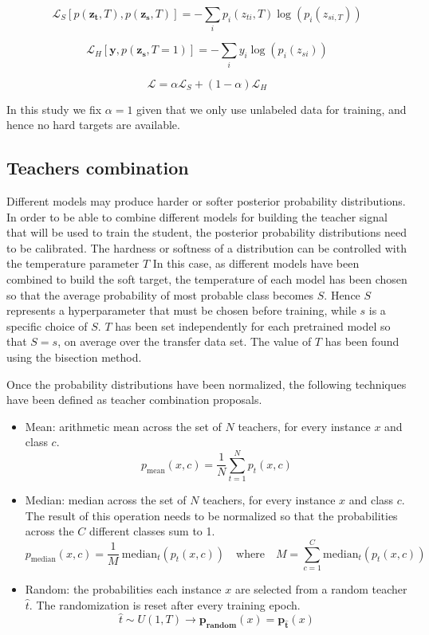 \documentclass{elsarticle}
\begin{document}
	\begin{equation}
	\mathcal{L}_S\left[p( \mathbf{z_t}, T), p(\mathbf{z_s}, T) \right] = -\sum_i p_i(z_{ti}, T) \log \left(p_i(z_{si, T})\right)
	\label{eq:ced}
	\end{equation}
	
	\begin{equation}
	\mathcal{L}_{H}\left[\mathbf{y}, p(\mathbf{z_s}, T=1) \right] = -\sum_i y_i \log \left(p_i(z_{si})\right)
	\label{eq:ces}
	\end{equation}
	
	\begin{equation}
	\mathcal{L} = \alpha \mathcal{L}_S + (1-\alpha) \mathcal{L}_{H}
	\label{eq:loss_distillation}
	\end{equation}
	
	In this study we fix $\alpha=1$ given that we only use unlabeled data for training, and hence no hard targets are available.
	
	\subsection{Teachers combination} \label{sec:teachers_comb}
	 Different models may produce harder or softer posterior probability distributions. In order to be able to combine  different models for building the teacher signal that will be used to train the student, the posterior probability distributions need to be calibrated. The hardness or softness of a distribution can be controlled with the temperature parameter $T$ In this case, as different models have been combined to build the soft target, the temperature of each model has been chosen so that the average probability of most probable class becomes $S$. Hence $S$ represents a hyperparameter that must be chosen before training, while $s$ is a specific choice of $S$.  $T$ has been set independently for each pretrained model so that $S=s$, on average over the transfer data set. The value of $T$ has been found using the bisection method.
	 
	 Once the probability distributions have been normalized, the following techniques have been defined as teacher combination proposals.
	 
	 \begin{itemize}
	 	\item Mean: arithmetic mean across the set of $N$ teachers, for every instance $x$ and class $c$. 
	 	$$p_{\text{mean}}(x, c) = \frac{1}{N} \sum_{t=1}^N p_{t}(x, c)$$
	 	\item Median: median across the set of $N$ teachers, for every instance $x$ and class $c$. The result of this operation needs to be normalized so that the probabilities across the $C$ different classes sum to 1. $$p_{\text{median}}(x, c) = \frac{1}{M} \ \text{median}_t( p_{t}(x, c)) \quad \text{where} \quad M = \sum_{c=1}^C  \text{median}_t( p_{t}(x, c))$$
	 	\item Random: the probabilities each instance $x$ are selected from a random teacher $\hat{t}$. The randomization is reset after every training epoch. 
	 	$$\hat{t} \sim U(1, T) \rightarrow \mathbf{p_\text{random}}(x) = \mathbf{p_{\hat{t}}}(x)$$ 
 	\end{itemize}
 
\end{document}
